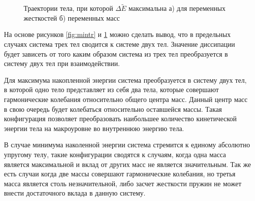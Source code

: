 \begin{figure}[t!]
    \centering
    \centering
    \begin{minipage}[h]{0.49\linewidth}
    \end{minipage}
    \begin{minipage}[h]{0.49\linewidth}
    \end{minipage}
    \caption{Траектории тела, при которой  $\Delta \tilde{E}$ максимальна а) для переменных жесткостей б) переменных масс}
    \label{fig:maxtr}
\end{figure}


На основе рисунков \ref{fig:mintr} и \ref{fig:maxtr} можно сделать вывод, что в предельных случаях система трех тел сводится к системе двух тел.
Значение диссипации будет зависеть от того каким образом система из трех тел преобразуется в систему двух тел при взаимодействии. 

Для максимума накопленной энергии система преобразуется в систему двух тел, в которой одно тело представляет из себя два тела, которые совершают гармонические колебания относительно общего
центра масс. Данный центр масс в свою очередь будет колебаться относительно оставшейся массы. Такая конфигурация позволяет преобразовать наибольшее количество
кинетической энергии тела на макроуровне во внутреннюю энергию тела.

В случае минимума наколенной энергии система стремится к единому абсолютно упругому телу, такие конфигурации сводятся к случаям, когда одна масса является
максимальной и вклад от других масс не является значительным. Так же есть случаи когда две массы совершают гармонические колебания, но третья масса является 
столь незначительной, либо засчет жесткости пружин не может внести достаточного вклада в данную систему. 
